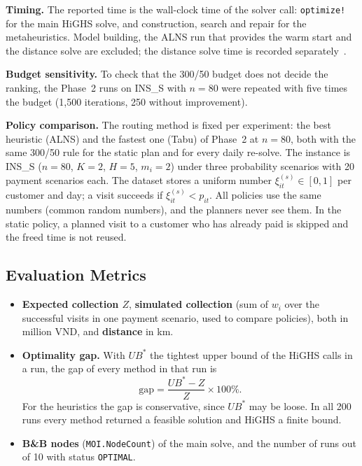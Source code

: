 \documentclass[11pt,a4paper]{article}
\begin{document}
\textbf{Timing.} The reported time is the wall-clock time of the solver call:
\texttt{optimize!} for the main HiGHS solve, and construction, search and
repair for the metaheuristics. Model building, the ALNS run that provides the
warm start and the distance solve are excluded; the distance solve time is
recorded separately~\cite{projectrepo}.

\textbf{Budget sensitivity.} To check that the 300/50 budget does not decide
the ranking, the Phase~2 runs on INS\_S with $n=80$ were repeated with five
times the budget (1{,}500 iterations, 250 without improvement).

\textbf{Policy comparison.} The routing method is fixed per experiment: the
best heuristic (ALNS) and the fastest one (Tabu) of Phase~2 at $n=80$, both
with the same 300/50 rule for the static plan and for every daily re-solve.
The instance is INS\_S ($n=80$, $K=2$, $H=5$, $m_i=2$) under three probability
scenarios with 20 payment scenarios each. The dataset stores a uniform number
$\xi^{(s)}_{it}\in[0,1]$ per customer and day; a visit succeeds if
$\xi^{(s)}_{it}<p_{it}$. All policies use the same numbers (common random
numbers), and the planners never see them. In the static policy, a planned
visit to a customer who has already paid is skipped and the freed time is
not reused.

\subsection{Evaluation Metrics}
\begin{itemize}
\item \textbf{Expected collection $Z$}, \textbf{simulated collection}
  (sum of $w_i$ over the successful visits in one payment scenario, used to
  compare policies), both in million VND, and \textbf{distance} in km.
\item \textbf{Optimality gap.} With $UB^\ast$ the tightest upper bound of the
  HiGHS calls in a run, the gap of every method in that run is
  \begin{equation}
  \mathrm{gap}=\frac{UB^\ast-Z}{Z}\times 100\%.
  \label{eq:gap}
  \end{equation}
  For the heuristics the gap is conservative, since $UB^\ast$ may be loose.
  In all 200 runs every method returned a feasible solution and HiGHS a
  finite bound.
\item \textbf{B\&B nodes} (\texttt{MOI.NodeCount}) of the main solve, and the
  number of runs out of 10 with status \texttt{OPTIMAL}.
\end{itemize}
\end{document}
